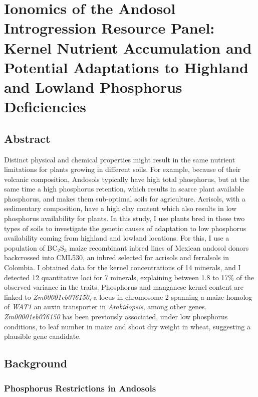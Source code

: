 \chapter{Ionomics of the Andosol Introgression Resource Panel: Kernel Nutrient Accumulation and Potential Adaptations to Highland and Lowland Phosphorus Deficiencies}
\label{chap-four}

\newrefsection

\section{Abstract}

 Distinct physical and chemical properties might result in the same nutrient limitations for plants growing in different soils.
 For example, because of their volcanic composition, Andosols typically have high total phosphorus, but at the same time a high phosphorus retention, which results in scarce plant available phosphorus, and makes them sub-optimal soils for agriculture. 
 Acrisols, with a sedimentary composition, have a high clay content which also results in low phosphorus availability for plants.
 In this study, I use plants bred in these two types of soils to investigate the genetic causes of adaptation to low phosphorus availability coming from highland and lowland locations.
 For this, I use a population of BC$_2$S$_3$ maize recombinant inbred lines of Mexican andosol donors backcrossed into CML530, an inbred selected for acrisols and ferralsols in Colombia.
 I obtained data for the kernel concentrations of 14 minerals, and I detected  12 quantitative loci for 7 minerals, explaining between 1.8 to 17\% of the observed variance in the traits.
 Phosphorus and manganese kernel content are linked to \textit{Zm00001eb076150}, a locus in chromosome 2 spanning a maize homolog of \textit{WAT1} an auxin transporter in
\textit{Arabidopsis}, among other genes. 
\textit{Zm00001eb076150} has been previously associated, under low phosphorus conditions,  to leaf number in maize and shoot dry weight in wheat, suggesting a plausible gene candidate. 

\section{Background}

\subsection{Phosphorus Restrictions in Andosols}

